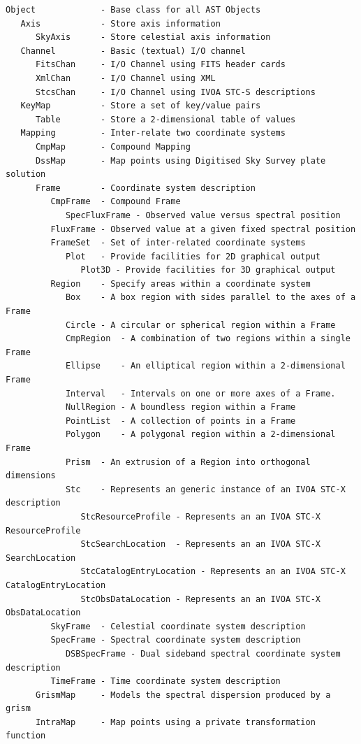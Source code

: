 \documentclass[twoside,11pt]{article}
\begin{document}
\small
\begin{verbatim}
Object             - Base class for all AST Objects
   Axis            - Store axis information
      SkyAxis      - Store celestial axis information
   Channel         - Basic (textual) I/O channel
      FitsChan     - I/O Channel using FITS header cards
      XmlChan      - I/O Channel using XML
      StcsChan     - I/O Channel using IVOA STC-S descriptions
   KeyMap          - Store a set of key/value pairs
      Table        - Store a 2-dimensional table of values
   Mapping         - Inter-relate two coordinate systems
      CmpMap       - Compound Mapping
      DssMap       - Map points using Digitised Sky Survey plate solution
      Frame        - Coordinate system description
         CmpFrame  - Compound Frame
            SpecFluxFrame - Observed value versus spectral position
         FluxFrame - Observed value at a given fixed spectral position
         FrameSet  - Set of inter-related coordinate systems
            Plot   - Provide facilities for 2D graphical output
               Plot3D - Provide facilities for 3D graphical output
         Region    - Specify areas within a coordinate system
            Box    - A box region with sides parallel to the axes of a Frame
            Circle - A circular or spherical region within a Frame
            CmpRegion  - A combination of two regions within a single Frame
            Ellipse    - An elliptical region within a 2-dimensional Frame
            Interval   - Intervals on one or more axes of a Frame.
            NullRegion - A boundless region within a Frame
            PointList  - A collection of points in a Frame
            Polygon    - A polygonal region within a 2-dimensional Frame
            Prism  - An extrusion of a Region into orthogonal dimensions
            Stc    - Represents an generic instance of an IVOA STC-X description
               StcResourceProfile - Represents an an IVOA STC-X ResourceProfile
               StcSearchLocation  - Represents an an IVOA STC-X SearchLocation
               StcCatalogEntryLocation - Represents an an IVOA STC-X CatalogEntryLocation
               StcObsDataLocation - Represents an an IVOA STC-X ObsDataLocation
         SkyFrame  - Celestial coordinate system description
         SpecFrame - Spectral coordinate system description
            DSBSpecFrame - Dual sideband spectral coordinate system description
         TimeFrame - Time coordinate system description
      GrismMap     - Models the spectral dispersion produced by a grism
      IntraMap     - Map points using a private transformation function

\end{verbatim}
\end{document}
